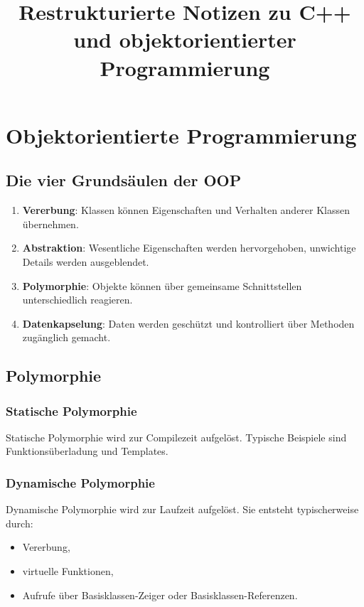 \documentclass[11pt,a4paper]{article}
\title{Restrukturierte Notizen zu C++ und objektorientierter Programmierung}
\author{}
\date{}
\newcommand{\important}[1]{\textbf{#1}}
\begin{document}
\maketitle
\tableofcontents
\newpage

\section{Objektorientierte Programmierung}

\subsection{Die vier Grundsäulen der OOP}
\begin{enumerate}[label=\arabic*.]
  \item \important{Vererbung}: Klassen können Eigenschaften und Verhalten anderer Klassen übernehmen.
  \item \important{Abstraktion}: Wesentliche Eigenschaften werden hervorgehoben, unwichtige Details werden ausgeblendet.
  \item \important{Polymorphie}: Objekte können über gemeinsame Schnittstellen unterschiedlich reagieren.
  \item \important{Datenkapselung}: Daten werden geschützt und kontrolliert über Methoden zugänglich gemacht.
\end{enumerate}

\subsection{Polymorphie}
\subsubsection{Statische Polymorphie}
Statische Polymorphie wird zur Compilezeit aufgelöst. Typische Beispiele sind Funktionsüberladung und Templates.

\subsubsection{Dynamische Polymorphie}
Dynamische Polymorphie wird zur Laufzeit aufgelöst. Sie entsteht typischerweise durch:
\begin{itemize}
  \item Vererbung,
  \item virtuelle Funktionen,
  \item Aufrufe über Basisklassen-Zeiger oder Basisklassen-Referenzen.
\end{itemize}
\end{document}
